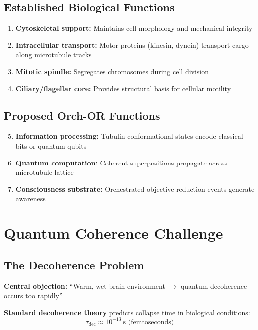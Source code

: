 \subsection{Established Biological Functions}

\begin{enumerate}
\item \textbf{Cytoskeletal support:} Maintains cell morphology and mechanical integrity
\item \textbf{Intracellular transport:} Motor proteins (kinesin, dynein) transport cargo along microtubule tracks
\item \textbf{Mitotic spindle:} Segregates chromosomes during cell division
\item \textbf{Ciliary/flagellar core:} Provides structural basis for cellular motility
\end{enumerate}

\subsection{Proposed Orch-OR Functions}

\begin{enumerate}
\setcounter{enumi}{4}
\item \textbf{Information processing:} Tubulin conformational states encode classical bits or quantum qubits
\item \textbf{Quantum computation:} Coherent superpositions propagate across microtubule lattice
\item \textbf{Consciousness substrate:} Orchestrated objective reduction events generate awareness
\end{enumerate}

\section{Quantum Coherence Challenge}

\subsection{The Decoherence Problem}

\textbf{Central objection:} ``Warm, wet brain environment $\rightarrow$ quantum decoherence occurs too rapidly''

\textbf{Standard decoherence theory} predicts collapse time in biological conditions:
\begin{equation}
\label{eq:decoherence-time}
\tau_{\text{dec}} \approx 10^{-13}~\text{s (femtoseconds)}
\end{equation}


